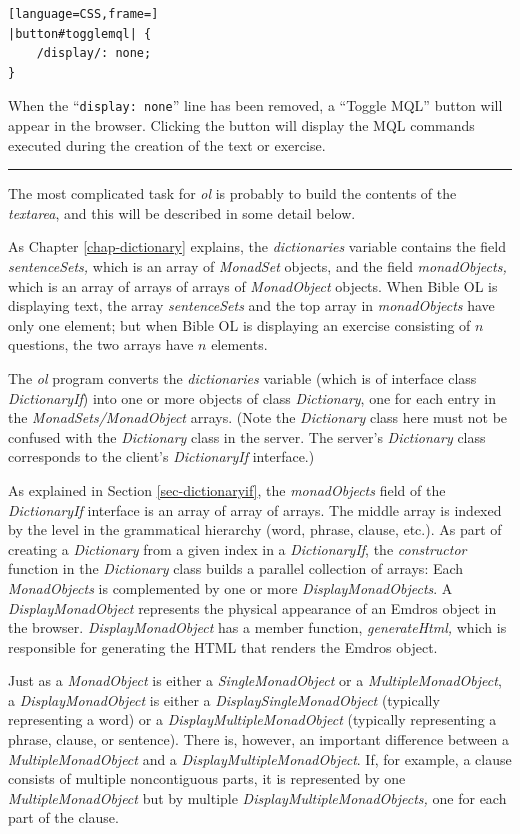 \documentclass[11pt,oneside,a4paper]{memoir}
\begin{document}
\begin{lstlisting}[language=CSS,frame=]
|button#togglemql| {
    /display/: none;
}
\end{lstlisting}

When the ``\texttt{display:~none}'' line has been removed, a ``Toggle MQL'' button will appear in
the browser. Clicking the button will display the MQL commands executed during the creation of the
text or exercise.

\pfbreak

The most complicated task for \emph{ol} is probably to build the contents of the \emph{textarea},
and this will be described in some detail below.

As Chapter \ref{chap-dictionary} explains, the \emph{dictionaries} variable contains the field
\emph{sentenceSets,} which is an array of \emph{MonadSet} objects, and the field
\emph{monadObjects,} which is an array of arrays of arrays of \emph{MonadObject} objects. When Bible
OL is displaying text, the array \emph{sentenceSets} and the top array in \emph{monadObjects} have
only one element; but when Bible OL is displaying an exercise consisting of $n$ questions, the
two arrays have $n$ elements.

The \emph{ol} program converts the \emph{dictionaries} variable (which is of interface class
\emph{DictionaryIf}) into one or more objects of class \emph{Dictionary}, one for each entry in the
\emph{MonadSets/MonadObject} arrays. (Note the \emph{Dictionary} class here must not be confused
with the \emph{Dictionary} class in the server. The server's \emph{Dictionary} class corresponds to
the client's \emph{DictionaryIf} interface.)

As explained in Section \ref{sec-dictionaryif}, the \emph{monadObjects} field of the
\emph{DictionaryIf} interface is an array of array of arrays. The middle array is indexed by the
level in the grammatical hierarchy (word, phrase, clause, etc.). As part of creating a
\emph{Dictionary} from a given index in a \emph{DictionaryIf}, the \emph{constructor} function in
the \emph{Dictionary} class builds a parallel collection of arrays: Each \emph{MonadObjects} is
complemented by one or more \emph{DisplayMonadObjects}. A \emph{DisplayMonadObject} represents the
physical appearance of an Emdros object in the browser. \emph{DisplayMonadObject} has a member
function, \emph{generateHtml,} which is responsible for generating the HTML that renders the Emdros
object.

Just as a \emph{MonadObject} is either a \emph{SingleMonadObject} or a \emph{MultipleMonadObject}, a
\emph{DisplayMonadObject} is either a \emph{DisplaySingleMonadObject} (typically representing a
word) or a \emph{DisplayMultipleMonadObject} (typically representing a phrase, clause, or sentence).
There is, however, an important difference between a \emph{MultipleMonadObject} and a
\emph{DisplayMultipleMonadObject}. If, for example, a clause consists of multiple noncontiguous
parts, it is represented by one \emph{MultipleMonadObject} but by multiple
\emph{DisplayMultipleMonadObjects,} one for each part of the clause.
\end{document}
